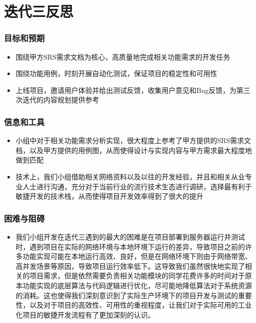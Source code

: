 \section{迭代三反思}
\begin{frame}
    \frametitle{目标和预期}
    \begin{itemize}
        \item 围绕甲方SRS需求文档为核心，高质量地完成相关功能需求的开发任务
        \item 围绕功能用例，时刻开展自动化测试，保证项目的稳定性和可用性
        \item 上线项目，邀请用户体验并给出测试反馈，收集用户意见和Bug反馈，为第三次迭代的内容规划提供参考
    \end{itemize}
\end{frame}

\begin{frame}
    \frametitle{信息和工具}
    \begin{itemize}
        \item 小组中对于相关功能需求分析实现，很大程度上参考了甲方提供的SRS需求文档，以及甲方提供的用例图，从而使得设计与实现内容与甲方需求最大程度地做到匹配
        \item 技术上，我们小组借助相关网络资料以及以往的开发经验，并且和相关从业专业人士进行沟通，充分对于当前行业的流行技术生态进行调研，选择最有利于敏捷开发的技术栈，从而使得项目开发效率得到了很大的提升
    \end{itemize}
\end{frame}

\begin{frame}
    \frametitle{困难与阻碍}
    \begin{itemize}
        \item 我们小组开发在迭代三遇到的最大的困难是在项目部署到服务器运行并测试时，遇到项目在实际的网络环境与本地环境下运行的差异，导致项目之前的许多功能实现可能在本地运行高效、良好，但是在网络环境下则由于网络带宽、高并发场景等原因，导致项目运行效率低下。这导致我们虽然很快地实现了相关的项目需求，但是依然需要负责相关功能模块的同学花费许多的时间对于原本功能实现的底层算法与代码逻辑进行优化，尽可能地降低算法对于系统资源的消耗。这也使得我们深刻意识到了实际生产环境下的项目开发与测试的重要性，以及对于项目的高效性、可用性的重视程度，让我们对于实际可用的工业化项目的敏捷开发流程有了更加深刻的认识。
    \end{itemize}
\end{frame}

